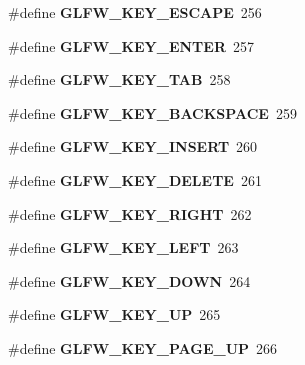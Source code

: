 \begin{DoxyCompactItemize}
\mbox{\label{group__keys_gaac6596c350b635c245113b81c2123b93}} 
\#define {\bfseries G\+L\+F\+W\+\_\+\+K\+E\+Y\+\_\+\+E\+S\+C\+A\+PE}~256
\item 
\mbox{\label{group__keys_ga9555a92ecbecdbc1f3435219c571d667}} 
\#define {\bfseries G\+L\+F\+W\+\_\+\+K\+E\+Y\+\_\+\+E\+N\+T\+ER}~257
\item 
\mbox{\label{group__keys_ga6908a4bda9950a3e2b73f794bbe985df}} 
\#define {\bfseries G\+L\+F\+W\+\_\+\+K\+E\+Y\+\_\+\+T\+AB}~258
\item 
\mbox{\label{group__keys_ga6c0df1fe2f156bbd5a98c66d76ff3635}} 
\#define {\bfseries G\+L\+F\+W\+\_\+\+K\+E\+Y\+\_\+\+B\+A\+C\+K\+S\+P\+A\+CE}~259
\item 
\mbox{\label{group__keys_ga373ac7365435d6b0eb1068f470e34f47}} 
\#define {\bfseries G\+L\+F\+W\+\_\+\+K\+E\+Y\+\_\+\+I\+N\+S\+E\+RT}~260
\item 
\mbox{\label{group__keys_gadb111e4df74b8a715f2c05dad58d2682}} 
\#define {\bfseries G\+L\+F\+W\+\_\+\+K\+E\+Y\+\_\+\+D\+E\+L\+E\+TE}~261
\item 
\mbox{\label{group__keys_ga06ba07662e8c291a4a84535379ffc7ac}} 
\#define {\bfseries G\+L\+F\+W\+\_\+\+K\+E\+Y\+\_\+\+R\+I\+G\+HT}~262
\item 
\mbox{\label{group__keys_gae12a010d33c309a67ab9460c51eb2462}} 
\#define {\bfseries G\+L\+F\+W\+\_\+\+K\+E\+Y\+\_\+\+L\+E\+FT}~263
\item 
\mbox{\label{group__keys_gae2e3958c71595607416aa7bf082be2f9}} 
\#define {\bfseries G\+L\+F\+W\+\_\+\+K\+E\+Y\+\_\+\+D\+O\+WN}~264
\item 
\mbox{\label{group__keys_ga2f3342b194020d3544c67e3506b6f144}} 
\#define {\bfseries G\+L\+F\+W\+\_\+\+K\+E\+Y\+\_\+\+UP}~265
\item 
\mbox{\label{group__keys_ga3ab731f9622f0db280178a5f3cc6d586}} 
\#define {\bfseries G\+L\+F\+W\+\_\+\+K\+E\+Y\+\_\+\+P\+A\+G\+E\+\_\+\+UP}~266

\end{DoxyCompactItemize}
